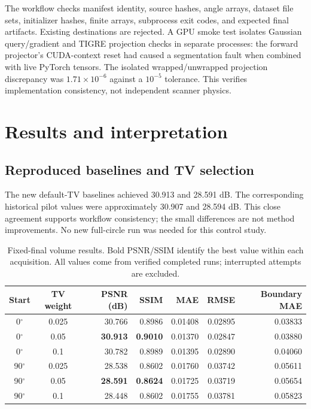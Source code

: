 \documentclass[10pt,a4paper]{article}
\begin{document}
The workflow checks manifest identity, source hashes, angle arrays, dataset file sets, initializer hashes, finite arrays, subprocess exit codes, and expected final artifacts. Existing destinations are rejected. A GPU smoke test isolates Gaussian query/gradient and TIGRE projection checks in separate processes: the forward projector's CUDA-context reset had caused a segmentation fault when combined with live PyTorch tensors. The isolated wrapped/unwrapped projection discrepancy was $1.71\times10^{-6}$ against a $10^{-5}$ tolerance. This verifies implementation consistency, not independent scanner physics.

\section{Results and interpretation}
\subsection{Reproduced baselines and TV selection}
The new default-TV baselines achieved 30.913 and 28.591 dB. The corresponding historical pilot values were approximately 30.907 and 28.594 dB. This close agreement supports workflow consistency; the small differences are not method improvements. No new full-circle run was needed for this control study.

\begin{table}[H]
\centering\small
\caption{Fixed-final volume results. Bold PSNR/SSIM identify the best value within each acquisition. All values come from verified completed runs; interrupted attempts are excluded.}
\begin{tabular}{ccrrrrr}
\toprule
Start & TV weight & PSNR (dB) & SSIM & MAE & RMSE & Boundary MAE\\
\midrule
0$^\circ$ & 0.025 & 30.766 & 0.8986 & 0.01408 & 0.02895 & 0.03833\\
0$^\circ$ & 0.05 & \textbf{30.913} & \textbf{0.9010} & 0.01370 & 0.02847 & 0.03880\\
0$^\circ$ & 0.1 & 30.782 & 0.8989 & 0.01395 & 0.02890 & 0.04060\\
\midrule
90$^\circ$ & 0.025 & 28.538 & 0.8602 & 0.01760 & 0.03742 & 0.05611\\
90$^\circ$ & 0.05 & \textbf{28.591} & \textbf{0.8624} & 0.01725 & 0.03719 & 0.05654\\
90$^\circ$ & 0.1 & 28.448 & 0.8602 & 0.01755 & 0.03781 & 0.05823\\
\bottomrule
\end{tabular}
\end{table}
\end{document}
